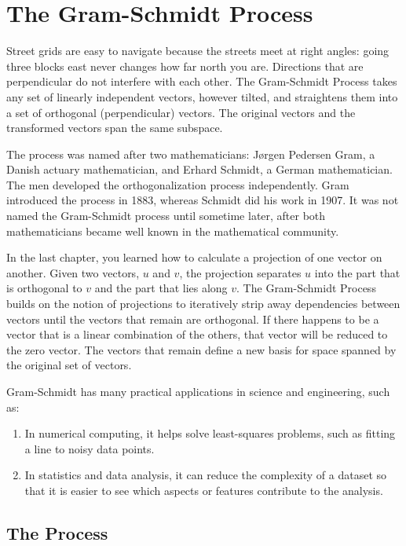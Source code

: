 \chapter{The Gram-Schmidt Process}

Street grids are easy to navigate because the streets meet at right angles:
going three blocks east never changes how far north you are. Directions
that are perpendicular do not interfere with each other. The Gram-Schmidt
Process takes any set of linearly independent vectors, however tilted,
and straightens them into a set of orthogonal (perpendicular) vectors. The original vectors and the transformed vectors span the same subspace. 

The process was named after two mathematicians: Jørgen Pedersen Gram, a Danish actuary mathematician, and Erhard Schmidt, a German mathematician. The men developed the orthogonalization process independently. Gram introduced the process in 1883, whereas Schmidt did his work in 1907.  It was not named the Gram-Schmidt process until sometime later, after both mathematicians became well known in the mathematical community.

In the last chapter, you learned how to calculate a projection of one vector on another. Given two vectors, $u$ and $v$, the projection separates $u$ into the part that is orthogonal to $v$ and the part that lies along $v$. The Gram-Schmidt Process builds on the notion of projections to iteratively strip away dependencies between vectors until the vectors that remain are orthogonal. If there happens to be a vector that is a linear combination of the others, that vector will be reduced to the zero vector. The vectors that remain define a new basis for space spanned by the original set of vectors. 

Gram-Schmidt has many practical applications in science and engineering, such as:
\begin{enumerate}
\item In numerical computing, it helps solve least-squares problems, such as fitting a line to noisy data points.
\item In statistics and data analysis, it can reduce the complexity of a dataset so that it is easier to see which aspects or features contribute to the analysis. 
\end{enumerate}

\section{The Process}


